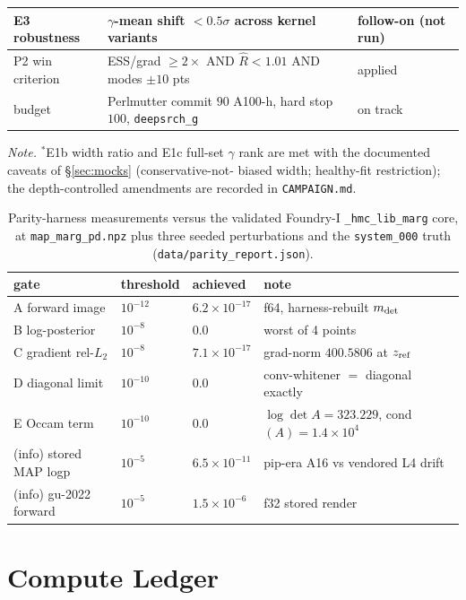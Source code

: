 \documentclass[11pt,letterpaper]{article}
\newcommand{\gammaEPL}{\ensuremath{\gamma}}
\newcommand{\Rhat}{\ensuremath{\hat{R}}}
\newcommand{\dfile}[1]{\texttt{#1}}
\begin{document}
\begin{table}[ht]
\begin{tabular}{lll}
E3 robustness          & $\gammaEPL$-mean shift $<0.5\sigma$ across kernel variants & follow-on (not run) \\
\midrule
P2 win criterion       & ESS/grad $\ge2\times$ AND $\Rhat<1.01$ AND modes $\pm10$ pts & applied \\
budget                 & Perlmutter commit $90$ A100-h, hard stop $100$, \texttt{deepsrch\_g} & on track \\
\bottomrule
\end{tabular}
\par\smallskip
{\footnotesize\textit{Note.} $^\ast$E1b width ratio and E1c full-set $\gammaEPL$
rank are met with the documented caveats of \S\ref{sec:mocks} (conservative-not-
biased width; healthy-fit restriction); the depth-controlled amendments are
recorded in \texttt{CAMPAIGN.md}.}
\end{table}

\begin{table}[ht]
\centering
\caption{Parity-harness measurements versus the validated Foundry-I
\texttt{\_hmc\_lib\_marg} core, at \texttt{map\_marg\_pd.npz} plus three seeded
perturbations and the \citet{gu2022gigalens} \texttt{system\_000} truth
(\dfile{data/parity\_report.json}).}
\label{tab:parity}
\begin{tabular}{llll}
\toprule
gate & threshold & achieved & note \\
\midrule
A forward image       & $10^{-12}$ & $6.2\times10^{-17}$ & f64, harness-rebuilt $m_{\rm det}$ \\
B log-posterior       & $10^{-8}$  & $0.0$ & worst of 4 points \\
C gradient rel-$L_2$  & $10^{-8}$  & $7.1\times10^{-17}$ & grad-norm $400.5806$ at $z_{\rm ref}$ \\
D diagonal limit      & $10^{-10}$ & $0.0$ & conv-whitener $=$ diagonal exactly \\
E Occam term          & $10^{-10}$ & $0.0$ & $\log\det A=323.229$, cond$(A)=1.4\times10^{4}$ \\
\midrule
(info) stored MAP logp & $10^{-5}$ & $6.5\times10^{-11}$ & pip-era A16 vs vendored L4 drift \\
(info) gu-2022 forward & $10^{-5}$ & $1.5\times10^{-6}$ & f32 stored render \\
\bottomrule
\end{tabular}
\end{table}

\section{Compute Ledger}
\label{app:ledger}
\end{document}

